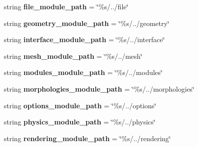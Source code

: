 \begin{DoxyCompactItemize}
\item 
string {\bfseries file\+\_\+module\+\_\+path} = \char`\"{}\%s/../file\char`\"{}\hypertarget{namespacemeshy__modules_a4ed470823cb6489d7192fc815dbe85d8}{}\label{namespacemeshy__modules_a4ed470823cb6489d7192fc815dbe85d8}

\item 
string {\bfseries geometry\+\_\+module\+\_\+path} = \char`\"{}\%s/../geometry\char`\"{}\hypertarget{namespacemeshy__modules_ad9eedcc6841404ac39ac4c558c20393d}{}\label{namespacemeshy__modules_ad9eedcc6841404ac39ac4c558c20393d}

\item 
string {\bfseries interface\+\_\+module\+\_\+path} = \char`\"{}\%s/../interface\char`\"{}\hypertarget{namespacemeshy__modules_a2ea5acce52c8dfc42e08ed0da5926939}{}\label{namespacemeshy__modules_a2ea5acce52c8dfc42e08ed0da5926939}

\item 
string {\bfseries mesh\+\_\+module\+\_\+path} = \char`\"{}\%s/../mesh\char`\"{}\hypertarget{namespacemeshy__modules_a3e12007616d5f3d3ef27089061b9c9fa}{}\label{namespacemeshy__modules_a3e12007616d5f3d3ef27089061b9c9fa}

\item 
string {\bfseries modules\+\_\+module\+\_\+path} = \char`\"{}\%s/../modules\char`\"{}\hypertarget{namespacemeshy__modules_afc7682e3af4bf7c9365de1a7af42f450}{}\label{namespacemeshy__modules_afc7682e3af4bf7c9365de1a7af42f450}

\item 
string {\bfseries morphologies\+\_\+module\+\_\+path} = \char`\"{}\%s/../morphologies\char`\"{}\hypertarget{namespacemeshy__modules_aedc22914ba49322d3d57edd8d251f66d}{}\label{namespacemeshy__modules_aedc22914ba49322d3d57edd8d251f66d}

\item 
string {\bfseries options\+\_\+module\+\_\+path} = \char`\"{}\%s/../options\char`\"{}\hypertarget{namespacemeshy__modules_ade826fed5a0655489b73e2356ef59e84}{}\label{namespacemeshy__modules_ade826fed5a0655489b73e2356ef59e84}

\item 
string {\bfseries physics\+\_\+module\+\_\+path} = \char`\"{}\%s/../physics\char`\"{}\hypertarget{namespacemeshy__modules_a4d6b048a2233173da1d3af9e7563d541}{}\label{namespacemeshy__modules_a4d6b048a2233173da1d3af9e7563d541}

\item 
string {\bfseries rendering\+\_\+module\+\_\+path} = \char`\"{}\%s/../rendering\char`\"{}\hypertarget{namespacemeshy__modules_a03d16b573beafd364b886355388aa38c}{}\label{namespacemeshy__modules_a03d16b573beafd364b886355388aa38c}


\end{DoxyCompactItemize}
